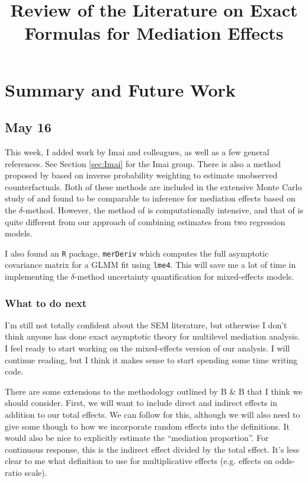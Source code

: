 \documentclass{article}
\title{Review of the Literature on Exact Formulas for Mediation Effects}
\begin{document}
\maketitle

\section{Summary and Future Work}

\subsection{May 16}

This week, I added work by Imai and colleagues, as well as a few general references. See Section \ref{sec:Imai} for the Imai group. There is also a method proposed by \citet{Lan12} based on inverse probability weighting to estimate unobserved counterfactuals. Both of these methods are included in the extensive Monte Carlo study of \citet{Sam23} and found to be comparable to inference for mediation effects based on the $\delta$-method. However, the method of \citet{Ima10I} is computationally intensive, and that of \citet{Lan12} is quite different from our approach of combining estimates from two regression models.

I also found an \texttt{R} package, \texttt{merDeriv} \citep{Wan18} which computes the full asymptotic covariance matrix for a GLMM fit using \texttt{lme4}. This will save me a lot of time in implementing the $\delta$-method uncertainty quantification for mixed-effects models. 

\subsubsection{What to do next}

I'm still not totally confident about the SEM literature, but otherwise I don't think anyone has done exact asymptotic theory for multilevel mediation analysis. I feel ready to start working on the mixed-effects version of our analysis. I will continue reading, but I think it makes sense to start spending some time writing code.

There are some extensions to the methodology outlined by B \& B that I think we should consider. First, we will want to include direct and indirect effects in addition to our total effects. We can follow \citet{Sam23} for this, although we will also need to give some though to how we incorporate random effects into the definitions. It would also be nice to explicitly estimate the ``mediation proportion''. For continuous response, this is the indirect effect divided by the total effect. It's less clear to me what definition to use for multiplicative effects (e.g. effects on odds-ratio scale).
\end{document}

